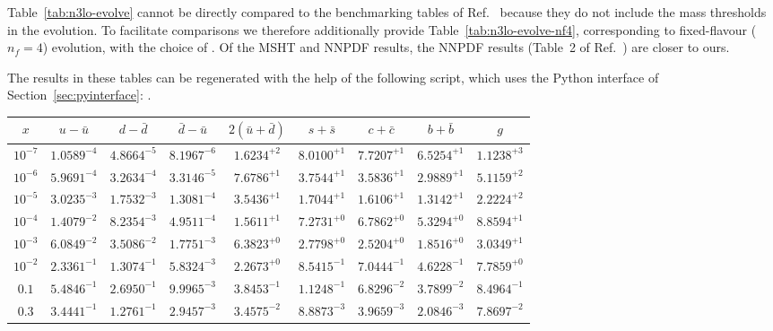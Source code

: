 Table~\ref{tab:n3lo-evolve} cannot be directly compared to the
benchmarking tables of Ref.~\cite{Cooper-Sarkar:2024crx} because they
do not include the mass thresholds in the \ntlo evolution.
%
To facilitate comparisons we therefore additionally provide
Table~\ref{tab:n3lo-evolve-nf4}, corresponding to fixed-flavour ($n_f=4$)
evolution, with the choice of
.
%
Of the MSHT and NNPDF results, the NNPDF results (Table~2 of
Ref.~\cite{Cooper-Sarkar:2024crx}) are closer to ours.

The results in these tables can be regenerated with the help of the
following script, which uses the Python interface of Section~\ref{sec:pyinterface}:
.

\begin{table}[p]
  \small \centering
  \begin{tabular}{c|cccccccc}
    $x$ &  $u-\bar u$ &$d-\bar d$ &$\bar d-\bar u$ &  $ 2(\bar u+\bar d)$  &$s+\bar s$&$c+\bar c$ &$b+\bar b$  &   $g$\\
    \toprule
$10^{-7}$ &  $1.0589^{-4}$ &  $4.8664^{-5}$ &  $8.1967^{-6}$ &  $1.6234^{+2}$ &  $8.0100^{+1}$ &  $7.7207^{+1}$ &  $6.5254^{+1}$ &  $1.1238^{+3}$ \\
$10^{-6}$ &  $5.9691^{-4}$ &  $3.2634^{-4}$ &  $3.3146^{-5}$ &  $7.6786^{+1}$ &  $3.7544^{+1}$ &  $3.5836^{+1}$ &  $2.9889^{+1}$ &  $5.1159^{+2}$ \\
$10^{-5}$ &  $3.0235^{-3}$ &  $1.7532^{-3}$ &  $1.3081^{-4}$ &  $3.5436^{+1}$ &  $1.7044^{+1}$ &  $1.6106^{+1}$ &  $1.3142^{+1}$ &  $2.2224^{+2}$ \\
$10^{-4}$ &  $1.4079^{-2}$ &  $8.2354^{-3}$ &  $4.9511^{-4}$ &  $1.5611^{+1}$ &  $7.2731^{+0}$ &  $6.7862^{+0}$ &  $5.3294^{+0}$ &  $8.8594^{+1}$ \\
$10^{-3}$ &  $6.0849^{-2}$ &  $3.5086^{-2}$ &  $1.7751^{-3}$ &  $6.3823^{+0}$ &  $2.7798^{+0}$ &  $2.5204^{+0}$ &  $1.8516^{+0}$ &  $3.0349^{+1}$ \\
$10^{-2}$ &  $2.3361^{-1}$ &  $1.3074^{-1}$ &  $5.8324^{-3}$ &  $2.2673^{+0}$ &  $8.5415^{-1}$ &  $7.0444^{-1}$ &  $4.6228^{-1}$ &  $7.7859^{+0}$ \\
$0.1$    &  $5.4846^{-1}$ &  $2.6950^{-1}$ &  $9.9965^{-3}$ &  $3.8453^{-1}$ &  $1.1248^{-1}$ &  $6.8296^{-2}$ &  $3.7899^{-2}$ &  $8.4964^{-1}$ \\
$0.3$    &  $3.4441^{-1}$ &  $1.2761^{-1}$ &  $2.9457^{-3}$ &  $3.4575^{-2}$ &  $8.8873^{-3}$ &  $3.9659^{-3}$ &  $2.0846^{-3}$ &  $7.8697^{-2}$ \\

\end{tabular}
\end{table}
